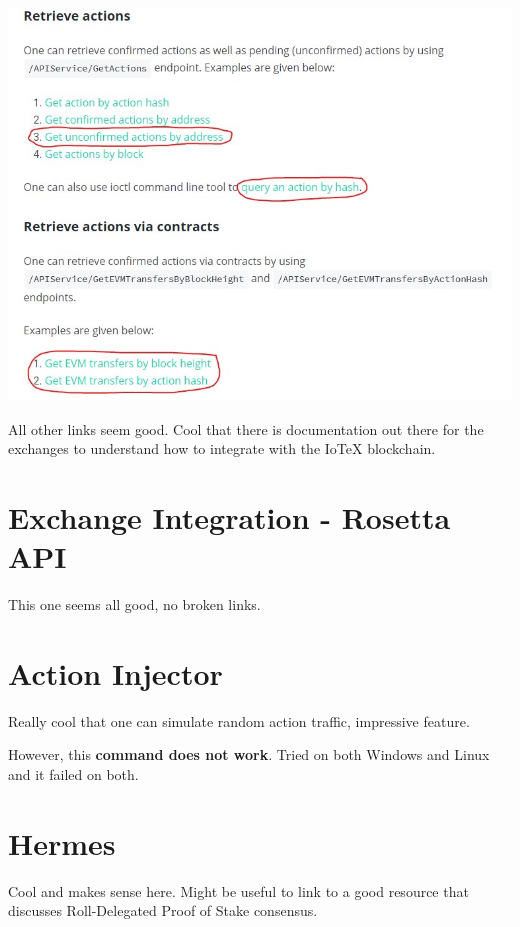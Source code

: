 \documentclass[
]{book}
\begin{document}
\includegraphics{images/retrieve_actions_link.jpg}

All other links seem good. Cool that there is documentation out there
for the exchanges to understand how to integrate with the IoTeX
blockchain.

\hypertarget{exchange-integration---rosetta-api}{%
\section{Exchange Integration - Rosetta
API}\label{exchange-integration---rosetta-api}}

This one seems all good, no broken links.

\hypertarget{action-injector}{%
\section{Action Injector}\label{action-injector}}

Really cool that one can simulate random action traffic, impressive
feature.

However, this \textbf{command does not work}. Tried on both Windows and
Linux and it failed on both.

\hypertarget{hermes}{%
\section{Hermes}\label{hermes}}

Cool and makes sense here. Might be useful to link to a good resource
that discusses Roll-Delegated Proof of Stake consensus.
\end{document}
